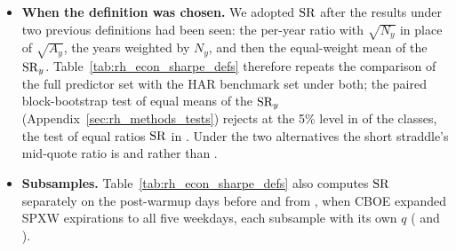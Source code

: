 \begin{itemize}
\item \textbf{When the definition was chosen.} We adopted $\mathrm{SR}$ after the results under two previous definitions had
  been seen: the per-year ratio with $\sqrt{N_y}$ in place of $\sqrt{A_y}$, the years weighted by $N_y$, and then the
  equal-weight mean of the $\mathrm{SR}_y$. Table~\ref{tab:rh_econ_sharpe_defs} therefore repeats the comparison of the full
  predictor set with the HAR benchmark set under both; the paired block-bootstrap test of equal means of the $\mathrm{SR}_y$
  (Appendix~\ref{sec:rh_methods_tests}) rejects at the 5\% level in \rheDefBootSig{} of the \rheDefN{} classes, the
  \citet{LedoitWolf2008} test of equal ratios $\mathrm{SR}$ in \rheDefPoolSig. Under the two alternatives the short
  straddle's mid-quote ratio is \rhemShDSixShort{} and \rhemShDOneShort{} rather than \rheShortSh.
\item \textbf{Subsamples.} Table~\ref{tab:rh_econ_sharpe_defs} also computes $\mathrm{SR}$ separately on the post-warmup
  days before and from \rheSplitDate, when CBOE expanded SPXW expirations to all five weekdays, each subsample with
  its own $q$ (\rheAnnDaysPre{} and \rheAnnDaysPost).
\end{itemize}


